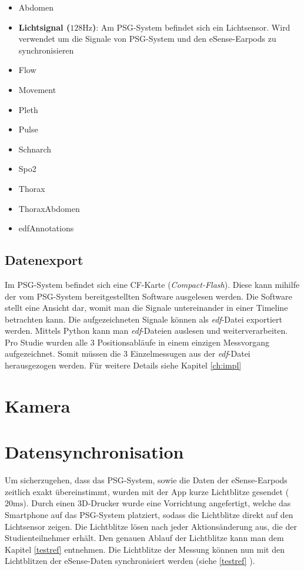 \begin{itemize}
    \item Abdomen
    \item \textbf{Lichtsignal ($128 \si{\hertz}$)}: Am PSG-System befindet sich ein Lichtsensor. Wird verwendet um die Signale von PSG-System und den eSense-Earpods zu synchronisieren
    \item Flow
    \item Movement
    \item Pleth
    \item Pulse
    \item Schnarch
    \item Spo2
    \item Thorax
    \item ThoraxAbdomen
    \item edfAnnotations
\end{itemize}

\subsection{Datenexport}
\label{ch:sa:psg:export}

Im PSG-System befindet sich eine CF-Karte (\textit{Compact-Flash}). Diese kann mihilfe der vom PSG-System bereitgestellten Software \glqq {}\grqq ausgelesen werden.
Die Software stellt eine Ansicht dar, womit man die Signale untereinander in einer Timeline betrachten kann. Die aufgezeichneten Signale können als \textit{edf}-Datei exportiert werden.
Mittels Python kann man \textit{edf}-Dateien auslesen und weiterverarbeiten.
Pro Studie wurden alle 3 Positionsabläufe in einem einzigen Messvorgang aufgezeichnet. Somit müssen die 3 Einzelmessugen aus der \textit{edf}-Datei herausgezogen werden.
Für weitere Details siehe Kapitel \ref{ch:impl} 

\section{Kamera}
\label{ch:sa:camera}

\section{Datensynchronisation}
\label{ch:sa:data_synchronisation}
Um sicherzugehen, dass das PSG-System, sowie die Daten der eSense-Earpods zeitlich exakt übereinstimmt, wurden mit der App kurze Lichtblitze gesendet ($20 \si{\ms}$).
Durch einen 3D-Drucker wurde eine Vorrichtung angefertigt, welche das Smartphone auf das PSG-System platziert, sodass die Lichtblitze direkt auf den Lichtsensor zeigen.
Die Lichtblitze lösen nach jeder Aktionsänderung aus, die der Studienteilnehmer erhält. 
Den genauen Ablauf der Lichtblitze kann man dem Kapitel \ref{testref} entnehmen.
Die Lichtblitze der Messung können nun mit den Lichtblitzen der eSense-Daten synchronisiert werden (siehe \ref{testref} ).

